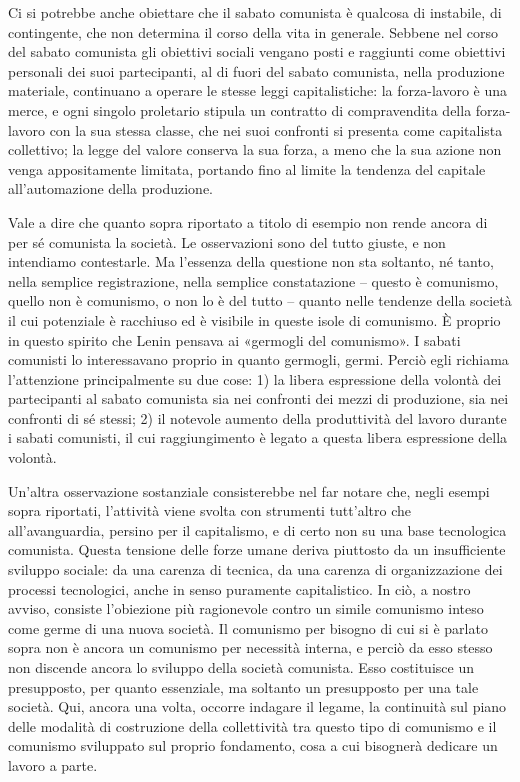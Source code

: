 \documentclass[../main]{subfiles}
\begin{document}
Ci si potrebbe anche obiettare che il sabato comunista è qualcosa di instabile, di contingente, che non determina il corso della vita in generale. Sebbene nel corso del sabato comunista gli obiettivi sociali vengano posti e raggiunti come obiettivi personali dei suoi partecipanti, al di fuori del sabato comunista, nella produzione materiale, continuano a operare le stesse leggi capitalistiche: la forza-lavoro è una merce, e ogni singolo proletario stipula un contratto di compravendita della forza-lavoro con la sua stessa classe, che nei suoi confronti si presenta come capitalista collettivo; la legge del valore conserva la sua forza, a meno che la sua azione non venga appositamente limitata, portando fino al limite la tendenza del capitale all'automazione della produzione.

Vale a dire che quanto sopra riportato a titolo di esempio non rende ancora di per sé comunista la società. Le osservazioni sono del tutto giuste, e non intendiamo contestarle. Ma l'essenza della questione non sta soltanto, né tanto, nella semplice registrazione, nella semplice constatazione – questo è comunismo, quello non è comunismo, o non lo è del tutto – quanto nelle tendenze della società il cui potenziale è racchiuso ed è visibile in queste isole di comunismo. È proprio in questo spirito che Lenin pensava ai «germogli del comunismo». I sabati comunisti lo interessavano proprio in quanto germogli, germi. Perciò egli richiama l'attenzione principalmente su due cose: 1) la libera espressione della volontà dei partecipanti al sabato comunista sia nei confronti dei mezzi di produzione, sia nei confronti di sé stessi; 2) il notevole aumento della produttività del lavoro durante i sabati comunisti, il cui raggiungimento è legato a questa libera espressione della volontà.

Un'altra osservazione sostanziale consisterebbe nel far notare che, negli esempi sopra riportati, l'attività viene svolta con strumenti tutt'altro che all'avanguardia, persino per il capitalismo, e di certo non su una base tecnologica comunista. Questa tensione delle forze umane deriva piuttosto da un insufficiente sviluppo sociale: da una carenza di tecnica, da una carenza di organizzazione dei processi tecnologici, anche in senso puramente capitalistico. In ciò, a nostro avviso, consiste l'obiezione più ragionevole contro un simile comunismo inteso come germe di una nuova società. Il comunismo per bisogno di cui si è parlato sopra non è ancora un comunismo per necessità interna, e perciò da esso stesso non discende ancora lo sviluppo della società comunista. Esso costituisce un presupposto, per quanto essenziale, ma soltanto un presupposto per una tale società. Qui, ancora una volta, occorre indagare il legame, la continuità sul piano delle modalità di costruzione della collettività tra questo tipo di comunismo e il comunismo sviluppato sul proprio fondamento, cosa a cui bisognerà dedicare un lavoro a parte.
\end{document}
